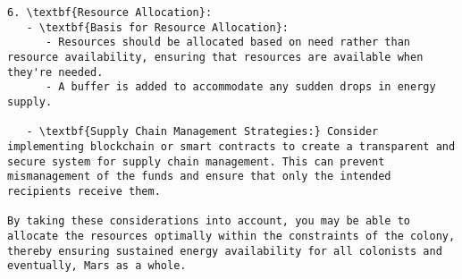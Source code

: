 \documentclass[11pt,a4paper]{article}
\begin{document}
\begin{verbatim}
6. \textbf{Resource Allocation}:
   - \textbf{Basis for Resource Allocation}:
      - Resources should be allocated based on need rather than resource availability, ensuring that resources are available when they're needed.
      - A buffer is added to accommodate any sudden drops in energy supply.
  
   - \textbf{Supply Chain Management Strategies:} Consider implementing blockchain or smart contracts to create a transparent and secure system for supply chain management. This can prevent mismanagement of the funds and ensure that only the intended recipients receive them.

By taking these considerations into account, you may be able to allocate the resources optimally within the constraints of the colony, thereby ensuring sustained energy availability for all colonists and eventually, Mars as a whole.
\end{verbatim}
\end{document}

